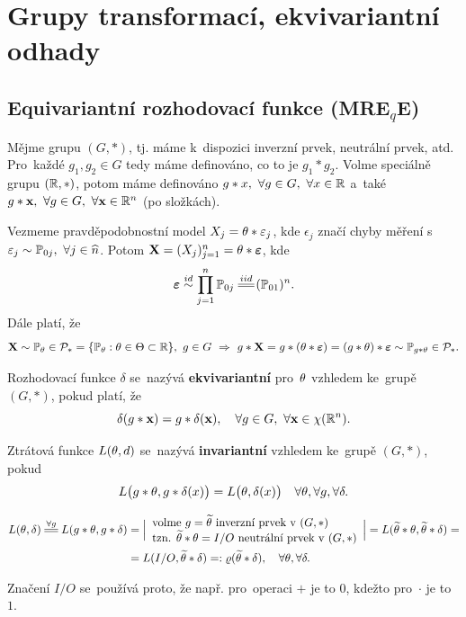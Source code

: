 \chapter{Grupy transformací, ekvivariantní odhady}

\section{Equivariantní rozhodovací funkce (MRE$_q$E)}
\begin{define}
	Mějme grupu $(G,\ast)$, tj. máme k~dispozici inverzní prvek, neutrální prvek, atd. Pro~každé $g_1,g_2\in G$ tedy máme definováno, co to je $g_1\ast g_2$. Volme speciálně grupu $(\mathbb{R},\ast)$, potom máme definováno $g\ast x,~\forall g\in G,~\forall x\in \mathbb{R} $ a~také $g\ast \textbf{x},~\forall g\in G,~\forall \textbf{x}\in\mathbb{R}^n$ (po složkách).
	
	Vezmeme pravděpodobnostní model $X_j=\theta\ast \varepsilon_j$, kde $\epsilon_j$ značí chyby měření s~$\varepsilon_j\sim \mathbb{P}_{0j},~\forall j\in\widehat{n}$. Potom $\textbf{X}=(X_j)_{j=1}^n=\theta\ast\boldsymbol{\varepsilon}$, kde $$\boldsymbol{\epsilon}\stackrel{id}{\sim}\prod_{j=1}^n \PP_{0j}\equal{iid}(\PP_{01})^n.$$
	Dále platí, že $$ \textbf{X}\sim \mathbb{P}_\theta\in\mathcal{P}_\ast=\{\mathbb{P}_\theta:\theta\in\Theta\subset \mathbb{R}\}, ~g\in G~\Rightarrow~ g\ast \textbf{X}=g\ast(\theta\ast\boldsymbol{\varepsilon})=(g\ast\theta)\ast\boldsymbol{\varepsilon}\sim \mathbb{P}_{g\ast \theta}\in \mathcal{P}_\ast.$$ 
\end{define}
\begin{define}
	Rozhodovací funkce $\delta$ se~nazývá \textbf{ekvivariantní} pro~$\theta$ vzhledem ke~grupě $(G,\ast)$, pokud platí, že $$ \delta(g\ast\textbf{x})=g\ast \delta(\textbf{x}),\quad \forall g\in G,~\forall \textbf{x}\in\chi(\mathbb{R}^n).$$
\end{define}
\begin{define}
	Ztrátová funkce $L(\theta,d)$ se~nazývá \textbf{invariantní} vzhledem ke~grupě $(G,\ast)$, pokud $$ L\big(g\ast\theta,g\ast\delta(x)\big)=L\big(\theta,\delta(x)\big)\quad\forall \theta,\forall g,\forall \delta.$$
\end{define}
\begin{dusl}
	\[
	\begin{split}
	L(\t,\delta)\equal{\forall g}L(g\ast\t,g\ast \delta)&=\Big| \begin{array}{l}
	\text{volme }g=\widetilde{\t}\text{ inverzní prvek v~}(G,\ast)\\\text{tzn. }\widetilde{\t}\ast\t=I/O\text{ neutrální prvek v~}(G,\ast)
	\end{array}
	\Big|=L(\widetilde{\t}\ast\t,\widetilde{\t}\ast\delta)=\\&=L(I/O,\widetilde{\t}\ast\delta)=:\rho(\widetilde{\t}\ast\delta),\quad\forall\t,\forall\delta.
	\end{split}
	\] 
	
	Značení $I/O$ se~používá proto, že např. pro~operaci $+$ je to $0$, kdežto pro~$\cdot$ je to $1$.
\end{dusl}
